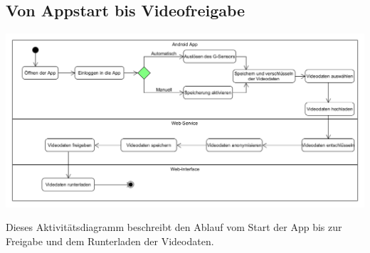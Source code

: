 \subsection{Von Appstart bis Videofreigabe}
\begin{center}
\includegraphics[width=1\textwidth]{subtopicsFuncspec/systemModels/AKDiagramm.png}
\end{center}
Dieses Aktivitätsdiagramm beschreibt den Ablauf vom Start der App bis zur Freigabe und dem Runterladen der Videodaten. 
